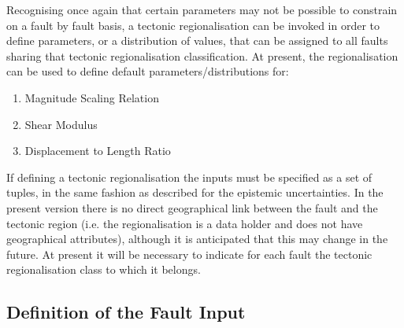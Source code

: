 Recognising once again that certain parameters may not be possible to constrain on a fault by fault basis, a tectonic regionalisation can be invoked in order to define parameters, or a distribution of values, that can be assigned to all faults sharing that tectonic regionalisation classification. At present, the regionalisation can be used to define default parameters/distributions for:

\begin{enumerate}
\item Magnitude Scaling Relation
\item Shear Modulus
\item Displacement to Length Ratio
\end{enumerate}

If defining a tectonic regionalisation the inputs must be specified as a set of tuples, in the same fashion as described for the epistemic uncertainties. In the present version there is no direct geographical link between the fault and the tectonic region (i.e. the regionalisation is a data holder and does not have geographical attributes), although it is anticipated that this may change in the future. At present it will be necessary to indicate for each fault the tectonic regionalisation class to which it belongs.


%
%

\subsection{Definition of the Fault Input}

